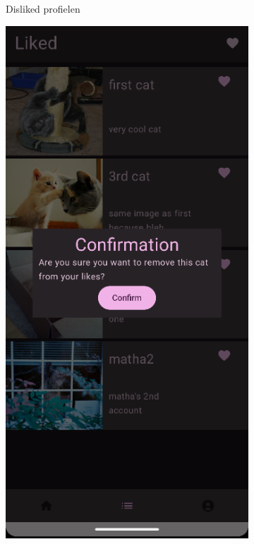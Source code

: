 \documentclass{report}
\begin{document}
\begin{figure}[h]
\begin{subfigure}[b]{0.32\textwidth}
        \caption{Disliked profielen}
    \end{subfigure}
    \hfill
    \begin{subfigure}[b]{0.32\textwidth}
        \includegraphics[width=\textwidth]{DEMO_List3.png} 

\end{subfigure}
\end{figure}
\end{document}
